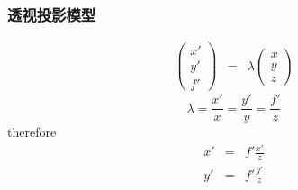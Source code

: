 \documentclass{beamer}
\begin{document}
{{{{\begin{frame}
  \
  
  \
  
  \qquad{}
\end{frame}}{\begin{frame}
  \frametitle{}
  
  \
  
  \
  
  
  \ 
\end{frame}}{\begin{frame}
  \frametitle{透视投影模型}
  
  
  \begin{eqnarray*}
    \left(\begin{array}{c}
      x'\\
      y'\\
      f'
    \end{array}\right) & = & \lambda \left(\begin{array}{c}
      x\\
      y\\
      z
    \end{array}\right)
  \end{eqnarray*}
  \[ \lambda = \frac{x'}{x} = \frac{y'}{y} = \frac{f'}{z} \]
  therefore
  \begin{eqnarray*}
    x' & = & f' \frac{x'}{z}\\
    y' & = & f' \frac{y'}{z}
  \end{eqnarray*}
  

\end{frame}}}}}
\end{document}

